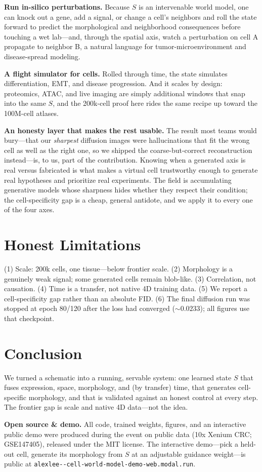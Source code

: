 \documentclass[10pt,twocolumn]{article}
\begin{document}
\noindent\textbf{Run in-silico perturbations.} Because $S$ is an intervenable
world model, one can knock out a gene, add a signal, or change a cell's
neighbors and roll the state forward to predict the morphological and
neighborhood consequences before touching a wet lab---and, through the spatial
axis, watch a perturbation on cell A propagate to neighbor B, a natural language
for tumor-microenvironment and disease-spread modeling.

\noindent\textbf{A flight simulator for cells.} Rolled through time, the state
simulates differentiation, EMT, and disease progression. And it scales by
design: proteomics, ATAC, and live imaging are simply additional windows that
snap into the same $S$, and the 200k-cell proof here rides the same recipe up
toward the 100M-cell atlases.

\noindent\textbf{An honesty layer that makes the rest usable.} The result most
teams would bury---that our \emph{sharpest} diffusion images were hallucinations
that fit the wrong cell as well as the right one, so we shipped the
coarse-but-correct reconstruction instead---is, to us, part of the contribution.
Knowing when a generated axis is real versus fabricated is what makes a virtual
cell trustworthy enough to generate real hypotheses and prioritize real
experiments. The field is accumulating generative models whose sharpness hides
whether they respect their condition; the cell-specificity gap is a cheap,
general antidote, and we apply it to every one of the four axes.

\FloatBarrier
\section{Honest Limitations}
(1) Scale: 200k cells, one tissue---below frontier scale. (2) Morphology is a
genuinely weak signal; some generated cells remain blob-like. (3) Correlation,
not causation. (4) Time is a transfer, not native 4D training data. (5) We report
a cell-specificity gap rather than an absolute FID. (6) The final diffusion run
was stopped at epoch 80/120 after the loss had converged ($\sim0.0233$); all
figures use that checkpoint.

\section{Conclusion}
We turned a schematic into a running, servable system: one learned state $S$ that
fuses expression, space, morphology, and (by transfer) time, that generates
cell-specific morphology, and that is validated against an honest control at
every step. The frontier gap is scale and native 4D data---not the idea.

\vspace{0.4em}
{\footnotesize\textbf{Open source \& demo.} All code, trained weights, figures,
and an interactive public demo were produced during the event on public data
(10x Xenium CRC; GSE147405), released under the MIT license. The interactive demo---pick a held-out cell,
generate its morphology from $S$ at an adjustable guidance weight---is public at
\texttt{alexlee-{}-cell-world-model-demo-web.modal.run}.}
\end{document}
